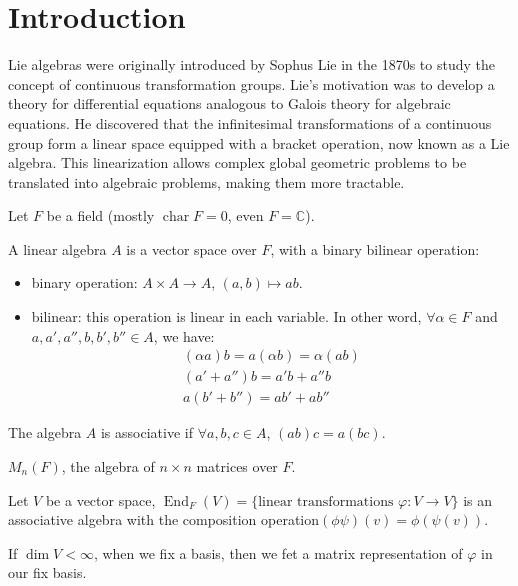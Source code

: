 \section{Introduction}

Lie algebras were originally introduced by Sophus Lie in the 1870s to study the concept of continuous transformation groups. Lie's motivation was to develop a theory for differential equations analogous to Galois theory for algebraic equations. He discovered that the infinitesimal transformations of a continuous group form a linear space equipped with a bracket operation, now known as a Lie algebra. This linearization allows complex global geometric problems to be translated into algebraic problems, making them more tractable.

Let $ F $ be a field (mostly $ \operatorname{char}F =0$, even $ F=\mathbb{C} $).

\begin{definition}
    A linear algebra $ A $ is a vector space over $ F $, with a binary bilinear operation:
    \begin{itemize}
        \item binary operation: $ A \times A \to A $, $ (a,b) \mapsto ab $.
        \item bilinear: this operation is linear in each variable. In other word, $ \forall \alpha \in F $ and $ a,a',a'',b,b',b'' \in A $, we have:
              \begin{align*}
                  (\alpha a)b=a(\alpha b) = \alpha (ab) \\
                  (a'+a'')b = a'b+a''b                  \\
                  a(b'+b'')=ab'+ab''
              \end{align*}
    \end{itemize}
    The algebra $ A $ is associative if $ \forall a,b,c \in A $, $ (ab)c=a(bc) $.
\end{definition}

\begin{example}
    $ M_n(F) $, the algebra of $ n \times n $ matrices over $ F $.
\end{example}

\begin{example}
    Let $ V $ be a vector space, $ \operatorname{End}_F (V) =\{ \text{linear transformations } \varphi: V\to V \}$ is an associative algebra with the composition operation$ (\phi \psi) (v)=\phi(\psi(v))$.

    If $ \dim V < \infty $, when we fix a basis, then we fet a matrix representation of $ \varphi $ in our fix basis.
\end{example}

